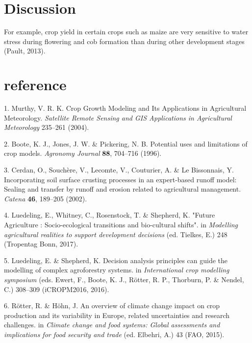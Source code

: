 \documentclass[12pt,oneside]{article}
\begin{document}
\hypertarget{V}{%
\section{Discussion}\label{V}}

For example, crop yield in certain crops such as maize are very sensitive to water stress during flowering and cob formation than during other development stages (Pault, 2013).

\hypertarget{VI}{%
\section*{reference}\label{VI}}

\hypertarget{refs}{}
\leavevmode\hypertarget{ref-Murthy_2004}{}%
1. Murthy, V. R. K. Crop Growth Modeling and Its Applications in Agricultural Meteorology. \emph{Satellite Remote Sensing and GIS Applications in Agricultural Meteorology} 235--261 (2004).

\leavevmode\hypertarget{ref-Boote_et_al_1996}{}%
2. Boote, K. J., Jones, J. W. \& Pickering, N. B. Potential uses and limitations of crop models. \emph{Agronomy Journal} \textbf{88}, 704--716 (1996).

\leavevmode\hypertarget{ref-Cerdan_et_al_2002}{}%
3. Cerdan, O., Souchère, V., Lecomte, V., Couturier, A. \& Le Bissonnais, Y. Incorporating soil surface crusting processes in an expert-based runoff model: Sealing and transfer by runoff and erosion related to agricultural management. \emph{Catena} \textbf{46}, 189--205 (2002).

\leavevmode\hypertarget{ref-Luedeling_et_al_2017}{}%
4. Luedeling, E., Whitney, C., Rosenstock, T. \& Shepherd, K. "Future Agriculture : Socio-ecological transitions and bio-cultural shifts". in \emph{Modelling agricultural realities to support development decisions} (ed. Tielkes, E.) 248 (Tropentag Bonn, 2017).

\leavevmode\hypertarget{ref-Luedeling_and_Shepherd_2016}{}%
5. Luedeling, E. \& Shepherd, K. Decision analysis principles can guide the modelling of complex agroforestry systems. in \emph{International crop modelling symposium} (eds. Ewert, F., Boote, K. J., Rötter, R. P., Thorburn, P. \& Nendel, C.) 308--309 (iCROPM2016, 2016).

\leavevmode\hypertarget{ref-Rotter_and_Hohn_2015}{}%
6. Rötter, R. \& Höhn, J. An overview of climate change impact on crop production and its variability in Europe, related uncertainties and research challenges. in \emph{Climate change and food systems: Global assessments and implications for food security and trade} (ed. Elbehri, A.) 43 (FAO, 2015).
\end{document}
